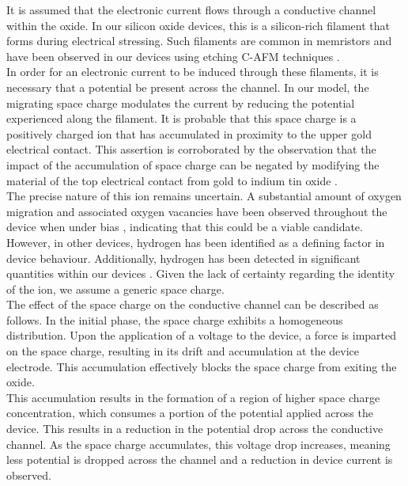 \noindent It is assumed that the electronic current flows through a conductive channel within the oxide. In our silicon oxide devices, this is a silicon-rich filament that forms during electrical stressing. Such filaments are common in memristors and have been observed in our devices using etching C-AFM techniques \cite{buckwell2015conductance}.\\

\noindent In order for an electronic current to be induced through these filaments, it is necessary that a potential be present across the channel. In our model, the migrating space charge modulates the current by reducing the potential experienced along the filament. It is probable that this space charge is a positively charged ion that has accumulated in proximity to the upper gold electrical contact. This assertion is corroborated by the observation that the impact of the accumulation of space charge can be negated by modifying the material of the top electrical contact from gold to indium tin oxide \cite{mannion2022current}.\\

\noindent The precise nature of this ion remains uncertain. A substantial amount of oxygen migration and associated oxygen vacancies have been observed throughout the device when under bias \cite{vanka2022hydrogen}, indicating that this could be a viable candidate. However, in other devices, hydrogen has been identified as a defining factor in device behaviour. Additionally, hydrogen has been detected in significant quantities within our devices \cite{lagarias1998convergence}. Given the lack of certainty regarding the identity of the ion, we assume a generic space charge.\\

\noindent The effect of the space charge on the conductive channel can be described as follows. In the initial phase, the space charge exhibits a homogeneous distribution. Upon the application of a voltage to the device, a force is imparted on the space charge, resulting in its drift and accumulation at the device electrode. This accumulation effectively blocks the space charge from exiting the oxide.  \\

\noindent This accumulation results in the formation of a region of higher space charge concentration, which consumes a portion of the potential applied across the device. This results in a reduction in the potential drop across the conductive channel. As the space charge accumulates, this voltage drop increases, meaning less potential is dropped across the channel and a reduction in device current is observed. \\

